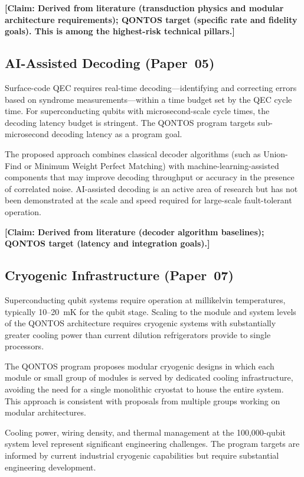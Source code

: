 \documentclass[conference]{IEEEtran}
\begin{document}
\textbf{[Claim: Derived from literature (transduction physics and modular architecture requirements); QONTOS target (specific rate and fidelity goals). This is among the highest-risk technical pillars.]}

\subsection{AI-Assisted Decoding (Paper~05)}

Surface-code QEC requires real-time decoding---identifying and correcting errors based on syndrome measurements---within a time budget set by the QEC cycle time. For superconducting qubits with microsecond-scale cycle times, the decoding latency budget is stringent. The QONTOS program targets sub-microsecond decoding latency as a program goal.

The proposed approach combines classical decoder algorithms (such as Union-Find or Minimum Weight Perfect Matching) with machine-learning-assisted components that may improve decoding throughput or accuracy in the presence of correlated noise. AI-assisted decoding is an active area of research but has not been demonstrated at the scale and speed required for large-scale fault-tolerant operation.

\textbf{[Claim: Derived from literature (decoder algorithm baselines); QONTOS target (latency and integration goals).]}

\subsection{Cryogenic Infrastructure (Paper~07)}

Superconducting qubit systems require operation at millikelvin temperatures, typically 10--20~mK for the qubit stage. Scaling to the module and system levels of the QONTOS architecture requires cryogenic systems with substantially greater cooling power than current dilution refrigerators provide to single processors.

The QONTOS program proposes modular cryogenic designs in which each module or small group of modules is served by dedicated cooling infrastructure, avoiding the need for a single monolithic cryostat to house the entire system. This approach is consistent with proposals from multiple groups working on modular architectures.

Cooling power, wiring density, and thermal management at the 100,000-qubit system level represent significant engineering challenges. The program targets are informed by current industrial cryogenic capabilities but require substantial engineering development.
\end{document}
